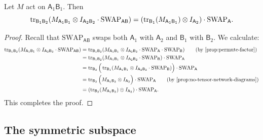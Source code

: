 \documentclass{article}
\newcommand{\swap}{\mathrm{SWAP}}
\newcommand{\reg}[1]{\mathsf{#1}}
\begin{document}
\begin{proposition}\label{prop:weird-prop}
    Let $M$ act on $\reg{A}_1 \reg{B}_1$.
    Then
    \begin{equation*}
        \tr_{\reg{B}_1 \reg{B}_2}( M_{\reg{A}_1\reg{B}_1} \otimes I_{\reg{A}_2 \reg{B}_2} \cdot \swap_{\reg{A} \reg{B}}) = (\tr_{\reg{B}_1}(M_{\reg{A}_1\reg{B}_1}) \otimes I_{\reg{A}_2}) \cdot \swap_{\reg{A}}.
    \end{equation*}
\end{proposition}
\begin{proof}  
    Recall that $\swap_{\reg{A}\reg{B}}$ swaps both $\reg{A}_1$ with $\reg{A}_2$ and $\reg{B}_1$ with $\reg{B}_2$.
    We calculate:
    \begin{align*}
    \tr_{\reg{B}_1\reg{B}_2}(M_{\reg{A}_1\reg{B}_1}  \otimes I_{\reg{A}_2\reg{B}_2} \cdot \swap_{\reg{A}\reg{B}})
    &= \tr_{\reg{B}_1\reg{B}_2}(M_{\reg{A}_1\reg{B}_1}  \otimes I_{\reg{A}_2\reg{B}_2} \cdot \swap_{\reg{A}} \cdot \swap_{\reg{B}})\tag{by \Cref{prop:permute-factor}}\\
    &= \tr_{\reg{B}_1\reg{B}_2}(M_{\reg{A}_1\reg{B}_1}  \otimes I_{\reg{A}_2\reg{B}_2} \cdot \swap_{\reg{B}}) \cdot \swap_{\reg{A}}\\
    &= \tr_{\reg{B}_2}\Big(\tr_{\reg{B}_1}(M_{\reg{A}_1\reg{B}_1}  \otimes I_{\reg{A}_2\reg{B}_2} \cdot \swap_{\reg{B}})\Big) \cdot \swap_{\reg{A}} \\
    &= \tr_{\reg{B}_2}\Big(M_{\reg{A}_1 \reg{B}_2} \otimes I_{\reg{A}_2}\Big) \cdot \swap_{\reg{A}} \tag{by \Cref{prop:no-tensor-network-diagrams}}\\
    &= (\tr_{\reg{B}_2}(M_{\reg{A}_1\reg{B}_2}) \otimes I_{\reg{A}_2}) \cdot \swap_{\reg{A}}.
\end{align*}
This completes the proof.
\end{proof}

\subsection{The symmetric subspace}
\end{document}
